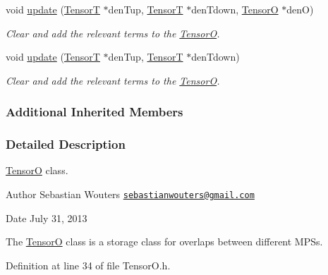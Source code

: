 \begin{DoxyCompactItemize}
void \hyperlink{classCheMPS2_1_1TensorO_ae18de2e237ca7555dd9c4deffd2c139b}{update} (\hyperlink{classCheMPS2_1_1TensorT}{Tensor\-T} $\ast$den\-Tup, \hyperlink{classCheMPS2_1_1TensorT}{Tensor\-T} $\ast$den\-Tdown, \hyperlink{classCheMPS2_1_1TensorO}{Tensor\-O} $\ast$den\-O)
\begin{DoxyCompactList}\small\item\em Clear and add the relevant terms to the \hyperlink{classCheMPS2_1_1TensorO}{Tensor\-O}. \end{DoxyCompactList}\item 
void \hyperlink{classCheMPS2_1_1TensorO_a93103fc63c21bd77d068ea20aed3d4a0}{update} (\hyperlink{classCheMPS2_1_1TensorT}{Tensor\-T} $\ast$den\-Tup, \hyperlink{classCheMPS2_1_1TensorT}{Tensor\-T} $\ast$den\-Tdown)
\begin{DoxyCompactList}\small\item\em Clear and add the relevant terms to the \hyperlink{classCheMPS2_1_1TensorO}{Tensor\-O}. \end{DoxyCompactList}\end{DoxyCompactItemize}
\subsubsection*{Additional Inherited Members}


\subsubsection{Detailed Description}
\hyperlink{classCheMPS2_1_1TensorO}{Tensor\-O} class. \begin{DoxyAuthor}{Author}
Sebastian Wouters \href{mailto:sebastianwouters@gmail.com}{\tt sebastianwouters@gmail.\-com} 
\end{DoxyAuthor}
\begin{DoxyDate}{Date}
July 31, 2013
\end{DoxyDate}
The \hyperlink{classCheMPS2_1_1TensorO}{Tensor\-O} class is a storage class for overlaps between different M\-P\-Ss. 

Definition at line 34 of file Tensor\-O.\-h.



